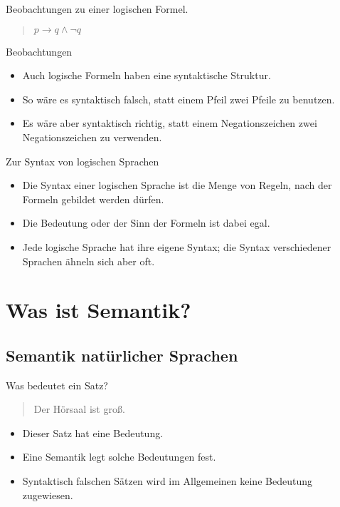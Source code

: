 \begin{frame}{Beobachtungen zu einer logischen Formel.}
  \begin{quotation}
    $p \to q \land \neg q$
  \end{quotation}

  \bigskip
  \begin{block}{Beobachtungen}
    \begin{itemize}
    \item Auch logische Formeln haben eine syntaktische Struktur.
    \item So wäre es \alert{syntaktisch falsch}, statt einem Pfeil zwei
      Pfeile zu benutzen.
    \item Es wäre aber \alert{syntaktisch richtig}, statt einem
      Negationszeichen zwei Negationszeichen zu verwenden.
    \end{itemize}
  \end{block}
\end{frame}

\begin{frame}{Zur Syntax von logischen Sprachen}
  \begin{itemize}
  \item Die \alert{Syntax} einer logischen Sprache ist die
    \alert{Menge von Regeln}, nach der Formeln gebildet werden 
    dürfen.
  \item Die \alert{Bedeutung} oder der \alert{Sinn} der Formeln
    ist dabei egal.
  \item
    Jede logische Sprache hat ihre eigene Syntax; die Syntax
    verschiedener Sprachen ähneln sich aber oft.
  \end{itemize}  
\end{frame}



\section{Was ist Semantik?}

\subsection[Semantik\protect\\ natürlicher Sprachen]{Semantik natürlicher Sprachen}

\begin{frame}{Was bedeutet ein Satz?}

  \begin{quotation}
    Der Hörsaal ist groß.
  \end{quotation}

  \bigskip
  \begin{itemize}
  \item Dieser Satz hat eine \alert{Bedeutung}.
  \item Eine \alert{Semantik} legt solche Bedeutungen fest.
  \item Syntaktisch falschen Sätzen wird im Allgemeinen keine
    Bedeutung zugewiesen.
  \end{itemize}
\end{frame}

